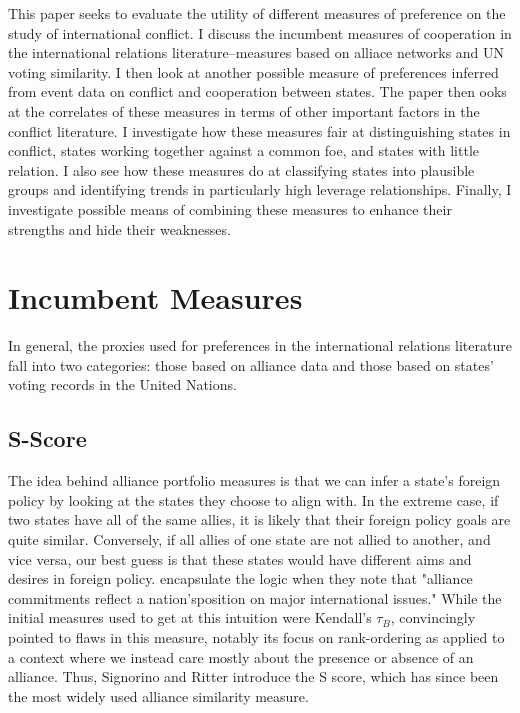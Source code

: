 \documentclass[12pt,onesided,fullpage]{amsart}
\begin{document}
This paper seeks to evaluate the utility of different measures of preference on the study of international conflict. I discuss the incumbent measures of cooperation in the international relations literature--measures based on alliace networks and UN voting similarity. I then look at another possible measure of preferences inferred from event data on conflict and cooperation between states. The paper then ooks at the correlates of these measures in terms of other important factors in the conflict literature. I investigate how these measures fair at distinguishing states in conflict, states working together against a common foe, and states with little relation. I also see how these measures do at classifying states into plausible groups and identifying trends in particularly high leverage relationships. Finally, I investigate possible means of combining these measures to enhance their strengths and hide their weaknesses.

\section{Incumbent Measures}
In general, the proxies used for preferences in the international relations literature fall into two categories: those based on alliance data and those based on states' voting records in the United Nations.
\subsection{S-Score}
The idea behind alliance portfolio measures is that we can infer a state's foreign policy by looking at the states they choose to align with. In the extreme case, if two states have all of the same allies, it is likely that their foreign policy goals are quite similar. Conversely, if all allies of one state are not allied to another, and vice versa, our best guess is that these states would have different aims and desires in foreign policy. \citet{altman:bdm:1979} encapsulate the logic when they note that "alliance commitments reflect a nation'sposition on major international issues." While the initial measures used to get at this intuition were Kendall's $\tau_{B}$, \citet{signorino:ritter:1999} convincingly pointed to flaws in this measure, notably its focus on rank-ordering as applied to a context where we instead care mostly about the presence or absence of an alliance. Thus, Signorino and Ritter introduce the S score, which has since been the most widely used alliance similarity measure.
\end{document}
